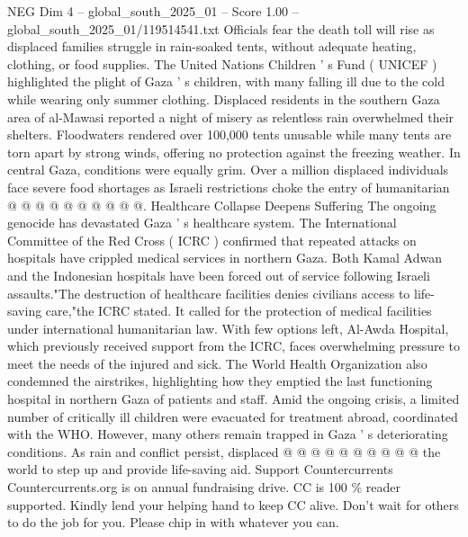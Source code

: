 \begin{textsample}{NEG Dim 4 – global\_south\_2025\_01 – Score 1.00 – global\_south\_2025\_01/119514541.txt}
Officials fear the death toll will rise as displaced families struggle in rain-soaked tents, without adequate heating, clothing, or food supplies.
The United Nations Children ' s Fund ( UNICEF ) highlighted the plight of Gaza ' s children, with many falling ill due to the cold while wearing only summer clothing.
Displaced residents in the southern Gaza area of al-Mawasi reported a night of misery as relentless rain overwhelmed their shelters.
Floodwaters rendered over 100,000 tents unusable while many tents are torn apart by strong winds, offering no protection against the freezing weather.
In central Gaza, conditions were equally grim.
Over a million displaced individuals face severe food shortages as Israeli restrictions choke the entry of humanitarian @ @ @ @ @ @ @ @ @ @.
Healthcare Collapse Deepens Suffering The ongoing genocide has devastated Gaza ' s healthcare system.
The International Committee of the Red Cross ( ICRC ) confirmed that repeated attacks on hospitals have crippled medical services in northern Gaza.
Both Kamal Adwan and the Indonesian hospitals have been forced out of service following Israeli assaults."The destruction of healthcare facilities denies civilians access to life-saving care,"the ICRC stated.
It called for the protection of medical facilities under international humanitarian law.
With few options left, Al-Awda Hospital, which previously received support from the ICRC, faces overwhelming pressure to meet the needs of the injured and sick.
The World Health Organization also condemned the airstrikes, highlighting how they emptied the last functioning hospital in northern Gaza of patients and staff.
Amid the ongoing crisis, a limited number of critically ill children were evacuated for treatment abroad, coordinated with the WHO.
However, many others remain trapped in Gaza ' s deteriorating conditions.
As rain and conflict persist, displaced @ @ @ @ @ @ @ @ @ @ the world to step up and provide life-saving aid.
Support Countercurrents Countercurrents.org is on annual fundraising drive.
CC is 100 \% reader supported.
Kindly lend your helping hand to keep CC alive.
Don't wait for others to do the job for you.
Please chip in with whatever you can.

\end{textsample}
